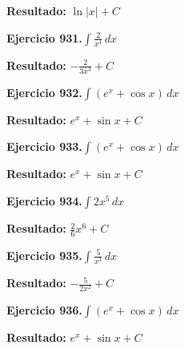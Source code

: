 \documentclass[10pt,a4paper]{article}
\begin{document}
\begin{solbox}
\textbf{Resultado:} \(\displaystyle \ln|x| + C\)
\end{solbox}

\newpage
\begin{ejbox}
\textbf{Ejercicio 931.}\quad $\int \frac{2}{x^{4}}\,dx$
\end{ejbox}

\begin{solbox}
\textbf{Resultado:} \(\displaystyle -\frac{2}{3x^{3}} + C\)
\end{solbox}

\begin{ejbox}
\textbf{Ejercicio 932.}\quad $\int (e^x + \cos x)\,dx$
\end{ejbox}

\begin{solbox}
\textbf{Resultado:} \(\displaystyle e^x + \sin x + C\)
\end{solbox}

\begin{ejbox}
\textbf{Ejercicio 933.}\quad $\int (e^x + \cos x)\,dx$
\end{ejbox}

\begin{solbox}
\textbf{Resultado:} \(\displaystyle e^x + \sin x + C\)
\end{solbox}

\newpage
\begin{ejbox}
\textbf{Ejercicio 934.}\quad $\int 2x^{5}\,dx$
\end{ejbox}

\begin{solbox}
\textbf{Resultado:} \(\displaystyle \frac{2}{6}x^{6} + C\)
\end{solbox}

\begin{ejbox}
\textbf{Ejercicio 935.}\quad $\int \frac{5}{x^{3}}\,dx$
\end{ejbox}

\begin{solbox}
\textbf{Resultado:} \(\displaystyle -\frac{5}{2x^{2}} + C\)
\end{solbox}

\begin{ejbox}
\textbf{Ejercicio 936.}\quad $\int (e^x + \cos x)\,dx$
\end{ejbox}

\begin{solbox}
\textbf{Resultado:} \(\displaystyle e^x + \sin x + C\)
\end{solbox}
\end{document}
